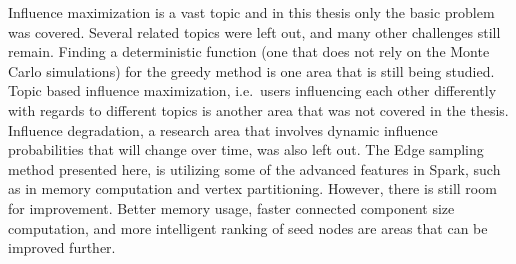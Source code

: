 \documentclass[english]{tktltiki}
\begin{document}
Influence maximization is a vast topic and in this thesis only the basic problem was covered. 
Several related topics were left out, and many other challenges still remain. 
Finding a deterministic function (one that does not rely on the Monte Carlo simulations) for the greedy method is one area that is still being studied. 
Topic based influence maximization, i.e.\ users influencing each other differently with regards to different topics is another area that was not covered in the thesis. 
Influence degradation, a research area that involves dynamic influence probabilities that will change over time, was also left out.
The Edge sampling method presented here, is utilizing some of the advanced features in Spark, such as in memory computation and vertex partitioning.
However, there is still room for improvement. 
Better memory usage, faster connected component size computation, and more intelligent ranking of seed nodes are areas that can be improved further.




\pagebreak



\lastpage

\appendices

\pagestyle{empty}
\end{document}
